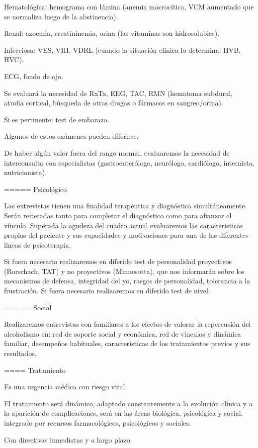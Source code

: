 \documentclass[encares.tex]{subfiles}
\begin{document}
Hematológica: hemograma con lámina (anemia macrocítica, VCM aumentado que se normaliza luego de la abstinencia).

Renal: azoemia, creatininemia, orina (las vitaminas son hidrosolubles).

Infecciosa: VES, VIH, VDRL (cuando la situación clínica lo determina: HVB, HVC).

ECG, fondo de ojo.

Se evaluará la necesidad de RxTx, EEG, TAC, RMN (hematoma subdural, atrofia cortical, búsqueda de otras drogas o fármacos en sangreo/orina).

Si es pertinente: test de embarazo.

Algunos de estos exámenes pueden diferirse.

De haber algún valor fuera del rango normal, evaluaremos la necesidad de interconsulta con especialistas (gastroenterólogo, neurólogo, cardiólogo, internista, nutricionista).

===== Psicológico

Las entrevistas tienen una finalidad terapéutica y diagnóstica simultáneamente. Serán reiteradas tanto para completar el diagnóstico como para afianzar el vínculo. Superada la agudeza del cuadro actual evaluaremos las características propias del paciente y sus capacidades y motivaciones para una de las diferentes líneas de psicoterapia.

Si fuera necesario realizaremos en diferido test de personalidad proyectivos (Rorschach, TAT) y no proyectivos (Minnesotta), que nos informarán sobre los mecanismos de defensa, integridad del yo, rasgos de personalidad, tolerancia a la frustración. Si fuera necesario realizaremos en diferido test de nivel.

===== Social

Realizaremos entrevistas con familiares a los efectos de valorar la repercusión del alcoholismo en: red de soporte social y económica, red de vínculos y dinámica familiar, desempeños habituales, características de los tratamientos previos y sus resultados.

==== Tratamiento

Es una urgencia médica con riesgo vital.

El tratamiento será dinámico, adaptado constantemente a la evolución clínica y a la aparición de complicaciones, será en las áreas biológica, psicológica y social, integrado por recursos farmacológicos, psicológicos y sociales.

Con directivas inmediatas y a largo plazo.
\end{document}
